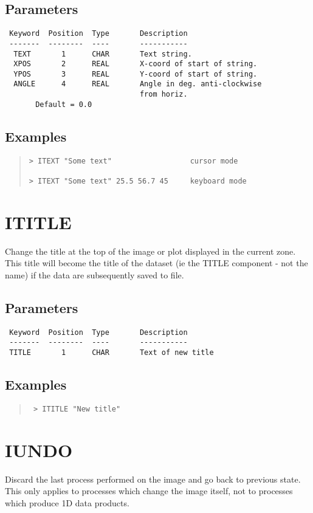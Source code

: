 \documentclass{book}
\renewcommand{\_}{{\tt\char'137}}     %
\begin{document}
\subsection{Parameters}
\begin{verbatim}
 Keyword  Position  Type       Description
 -------  --------  ----       -----------
  TEXT       1      CHAR       Text string.
  XPOS       2      REAL       X-coord of start of string.
  YPOS       3      REAL       Y-coord of start of string.
  ANGLE      4      REAL       Angle in deg. anti-clockwise
                               from horiz.
       Default = 0.0

\end{verbatim}\subsection{Examples}
\begin{quote}\begin{verbatim}
> ITEXT "Some text"                  cursor mode

> ITEXT "Some text" 25.5 56.7 45     keyboard mode
\end{verbatim}\end{quote}
\section{ITITLE}
Change the title at the top of the image or plot displayed in the
current zone. This title will become the title of the dataset
(ie the TITLE component - not the name) if the data are subsequently
saved to file.

\subsection{Parameters}
\begin{verbatim}
 Keyword  Position  Type       Description
 -------  --------  ----       -----------
 TITLE       1      CHAR       Text of new title

\end{verbatim}\subsection{Examples}
\begin{quote}\begin{verbatim}
 > ITITLE "New title"
 \end{verbatim}\end{quote}
\section{IUNDO}
Discard the last process performed on the image and go back to
previous state. This only applies to processes which change
the image itself, not to processes which produce 1D data
products.
\end{document}
